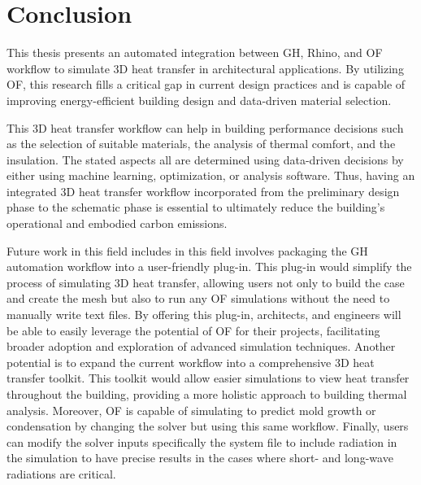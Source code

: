 \chapter{Conclusion}
This thesis presents an automated integration between  \gls{GH}, Rhino, and \gls{OF} workflow to simulate 3D heat transfer in architectural applications. 
By utilizing \gls{OF}, this research fills a critical gap in current design practices and is capable of improving energy-efficient building design and data-driven material selection. 

This 3D heat transfer workflow can help in building performance decisions such as the selection of suitable materials, the analysis of thermal comfort, and the insulation.
The stated aspects all are determined using data-driven decisions by either using machine learning, optimization, or analysis software. Thus, having an integrated 3D heat transfer workflow incorporated from the preliminary design phase to the schematic phase is essential to ultimately reduce the building's operational and embodied carbon emissions. 

Future work in this field includes in this field involves packaging the \gls{GH} automation workflow into a user-friendly plug-in. This plug-in would simplify the process of simulating 3D heat transfer, allowing users not only to build the case and create the mesh but also to run any \gls{OF} simulations without the need to manually write text files. By offering this plug-in, architects, and engineers will be able to easily leverage the potential of \gls{OF} for their projects, facilitating broader adoption and exploration of advanced simulation techniques. Another potential is to expand the current workflow into a comprehensive 3D heat transfer toolkit. This toolkit would allow easier simulations to view heat transfer throughout the building, providing a more holistic approach to building thermal analysis. Moreover, \gls{OF} is capable of simulating to predict mold growth or condensation by changing the solver but using this same workflow. Finally, users can modify the solver inputs specifically the system file to include radiation in the simulation to have precise results in the cases where short- and long-wave radiations are critical. 










